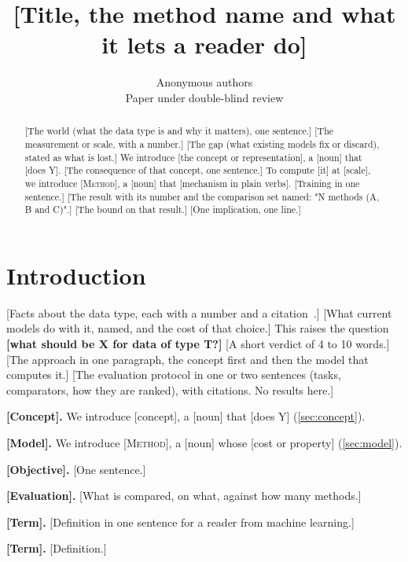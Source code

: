 \documentclass{article}
\title{[Title, the method name and what it lets a reader do]}
\author{Anonymous authors\\Paper under double-blind review}
\newcommand{\method}{\textsc{[Method]}}
\begin{document}
\maketitle
\tightenmaindisplays

\begin{abstract}
[The world (what the data type is and why it matters), one sentence.]
[The measurement or scale, with a number.]
[The gap (what existing models fix or discard), stated as what is lost.]
We introduce [the concept or representation], a [noun] that [does Y].
[The consequence of that concept, one sentence.]
To compute [it] at [scale], we introduce \method{}, a [noun] that [mechanism in plain verbs].
[Training in one sentence.]
[The result with its number and the comparison set named: "N methods (A, B and C)".]
[The bound on that result.]
[One implication, one line.]
\end{abstract}

\section{Introduction}\label{sec:intro}
[Facts about the data type, each with a number and a citation~\citep{assran2023ijepa}.]
[What current models do with it, named, and the cost of that choice.]
This raises the question \textbf{[what should be X for data of type T?]}
[A short verdict of 4 to 10 words.]
[The approach in one paragraph, the concept first and then the model that computes it.]
[The evaluation protocol in one or two sentences (tasks, comparators, how they are ranked), with citations. No results here.]

\begin{contributions}
\textbf{[Concept].} We introduce [concept], a [noun] that [does Y] (\cref{sec:concept}).\par
\textbf{[Model].} We introduce \method{}, a [noun] whose [cost or property] (\cref{sec:model}).\par
\textbf{[Objective].} [One sentence.]\par
\textbf{[Evaluation].} [What is compared, on what, against how many methods.]
\end{contributions}

\begin{terminology}[{[Application] terms}]
\textbf{[Term].} [Definition in one sentence for a reader from machine learning.]\par
\textbf{[Term].} [Definition.]
\end{terminology}
\end{document}

